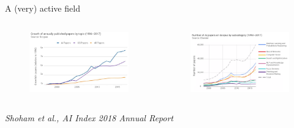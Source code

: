 \documentclass[handout]{beamer}
\newcommand{\rref}[1][]{\hfill{\scriptsize\textit{#1}}}
\begin{document}
 \begin{frame}{A (very) active field}
\begin{columns}
\begin{figure}
\includegraphics[width=\textwidth]{fig/L1/progress-papers.png}
\end{figure}

\begin{figure}
\includegraphics[width=\textwidth]{fig/L1/progress-ml.png}
\end{figure}
  \end{columns}
  \rref[Shoham et al., AI Index 2018 Annual Report]

\end{frame}
\end{document}
